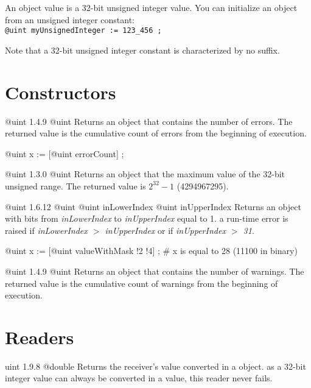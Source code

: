 

An  object value is a 32-bit unsigned integer value. You can initialize an  object from an unsigned integer constant:\\

\texttt{@uint myUnsignedInteger := 123\_456 ;}

Note that a 32-bit unsigned integer constant is characterized by no suffix.

\section{Constructors}

{@uint}
{1.4.9}
{@uint}
{Returns an  object that contains the number of errors.}
{The returned value is the cumulative count of errors from the beginning of execution.}

\exempleUneLigne
{}
{@uint x := [@uint errorCount] ;}

{@uint}
{1.3.0}
{@uint}
{Returns an  object that the maximum value of the 32-bit unsigned range.}
{The returned value is $2^{32}-1$ (4294967295).}


{@uint}
{1.6.12}
{@uint}
{@uint inLowerIndex}
{@uint inUpperIndex}
{Returns an  object with bits from \emph{inLowerIndex} to \emph{inUpperIndex} equal to 1.}
{a run-time error is raised if \emph{inLowerIndex $>$ inUpperIndex} or if \emph{inUpperIndex $>$ 31}.}


\exempleUneLigne
{}
{@uint x := [@uint valueWithMask !2 !4] ; \# x is equal to 28 (11100 in binary)}





{@uint}
{1.4.9}
{@uint}
{Returns an  object that contains the number of warnings.}
{The returned value is the cumulative count of warnings from the beginning of execution.}

\section{Readers}

{uint}
{1.9.8}
{@double}
{Returns the receiver's value converted in a  object.}
{as a 32-bit integer value can always be converted in a  value, this reader never fails.}



